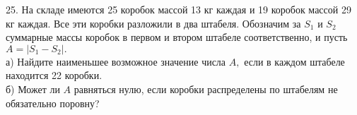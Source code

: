 25. На складе имеются 25 коробок массой 13 кг каждая и 19 коробок массой 29 кг каждая. Все эти коробки разложили в два штабеля. Обозначим за $S_1$ и $S_2$ суммарные массы коробок в первом и втором штабеле соответственно, и пусть $A=|S_1-S_2|.$\\
а) Найдите наименьшее возможное значение числа $A,$ если в каждом штабеле находится 22 коробки.\\
б) Может ли $A$ равняться нулю, если коробки распределены по штабелям не обязательно поровну?\\
